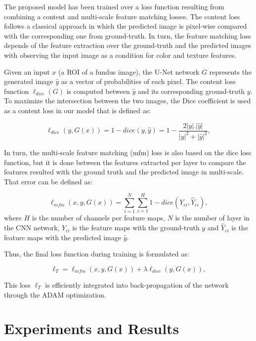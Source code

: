 \documentclass[runningheads,a4paper]{llncs}
\begin{document}
The proposed model has been trained over a loss function resulting from combining a content and multi-scale feature matching losses. The content loss follows a classical approach in which the predicted image is pixel-wise compared with the corresponding one from ground-truth. In turn, the feature matching loss depends of the feature extraction over the ground-truth and the predicted images with observing the input image as a condition for color and texture features. 

Given an input $x$ (a ROI of a fundus image), the U-Net network $G$ represents the generated image $\hat{y}$ as a vector of probabilities of each pixel. The content loss function $\ell_{dice}(G)$ is computed between $\hat{y}$ and its corresponding ground-truth $y$. To maximize the intersection between the two images, the Dice coefficient is used as a content loss in our model that is defined as:

\begin{equation}
    \ell_{dice}(y,G(x))= 1- dice(y, \hat{y}) = 1- \frac{2 |y| . | \hat{y} |}{|y|^2 + | \hat{y} |^2} , \label{equation:dc}
\end{equation}

In turn, the multi-scale feature matching (mfm) loss is also based on the dice loss function, but it is done between the features extracted per layer to compare the features resulted with the ground truth and the predicted image in multi-scale. That error can be defined as:

\begin{equation}
  \ell_{mfm} (x, y, G(x))= \sum_{i=1}^{N} \sum_{c=1}^{H} 1- dice(Y_{ci}, \hat{Y}_{ci}), 
 \label{equation:dc}
\end{equation}
where $H$ is the number of channels per feature maps, $N$ is the number of layer in the CNN network, $Y_{ci}$ is the feature maps with the ground-truth $y$ and $\hat{Y}_{ci}$ is the feature maps with the predicted image $\hat{y}$.

Thus, the final loss function during training is formulated as:

\begin{equation}
    \ell_{T}=\ell_{mfm}(x,y,G(x))+ \lambda \ell_{dice}(y,G(x)), \label{equation:dc}
\end{equation}

This loss $\ell_{T}$ is efficiently integrated into back-propagation of the network through the ADAM optimization.

\section{Experiments and Results}
\end{document}
